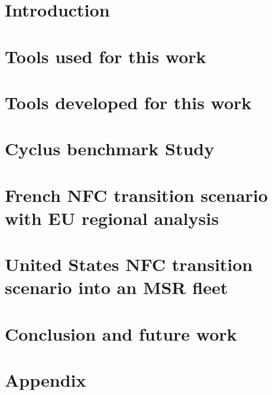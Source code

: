 \documentclass{report}
\begin{document}
\pagebreak

\chapter{Introduction}


\chapter{Tools used for this work}



\chapter{Tools developed for this work}


\chapter{Cyclus benchmark Study}


\FloatBarrier



\chapter{French \gls{NFC} transition scenario with \gls{EU} regional analysis}



\chapter{United States \gls{NFC} transition scenario into an \gls{MSR} fleet}


\chapter{Conclusion and future work}


\chapter{Appendix}






\end{document}
